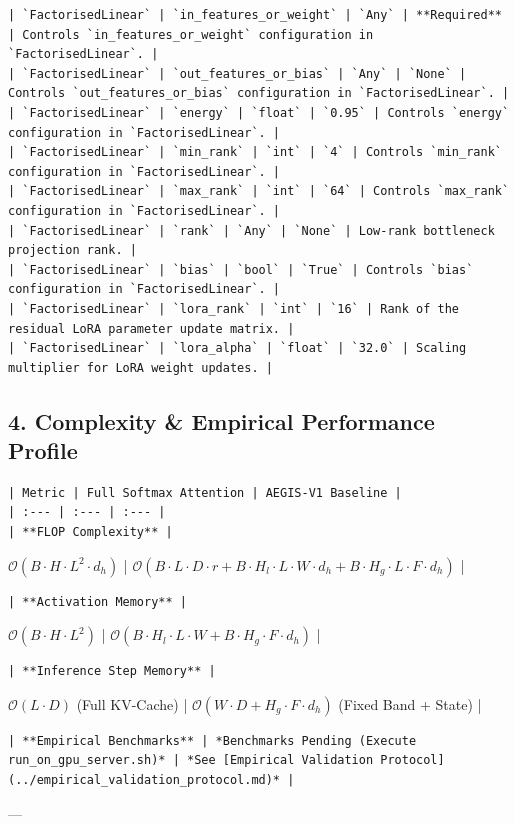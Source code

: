 \begin{verbatim}
| `FactorisedLinear` | `in_features_or_weight` | `Any` | **Required** | Controls `in_features_or_weight` configuration in `FactorisedLinear`. |
| `FactorisedLinear` | `out_features_or_bias` | `Any` | `None` | Controls `out_features_or_bias` configuration in `FactorisedLinear`. |
| `FactorisedLinear` | `energy` | `float` | `0.95` | Controls `energy` configuration in `FactorisedLinear`. |
| `FactorisedLinear` | `min_rank` | `int` | `4` | Controls `min_rank` configuration in `FactorisedLinear`. |
| `FactorisedLinear` | `max_rank` | `int` | `64` | Controls `max_rank` configuration in `FactorisedLinear`. |
| `FactorisedLinear` | `rank` | `Any` | `None` | Low-rank bottleneck projection rank. |
| `FactorisedLinear` | `bias` | `bool` | `True` | Controls `bias` configuration in `FactorisedLinear`. |
| `FactorisedLinear` | `lora_rank` | `int` | `16` | Rank of the residual LoRA parameter update matrix. |
| `FactorisedLinear` | `lora_alpha` | `float` | `32.0` | Scaling multiplier for LoRA weight updates. |
\end{verbatim}


\subsection{4. Complexity \& Empirical Performance Profile}
\begin{verbatim}
| Metric | Full Softmax Attention | AEGIS-V1 Baseline |
| :--- | :--- | :--- |
| **FLOP Complexity** | 
\end{verbatim}$\mathcal{O}(B \cdot H \cdot L^2 \cdot d_h)$ | $\mathcal{O}(B \cdot L \cdot D \cdot r + B \cdot H_l \cdot L \cdot W \cdot d_h + B \cdot H_g \cdot L \cdot F \cdot d_h)$ |
\begin{verbatim}
| **Activation Memory** | 
\end{verbatim}$\mathcal{O}(B \cdot H \cdot L^2)$ | $\mathcal{O}(B \cdot H_l \cdot L \cdot W + B \cdot H_g \cdot F \cdot d_h)$ |
\begin{verbatim}
| **Inference Step Memory** | 
\end{verbatim}$\mathcal{O}(L \cdot D)$ (Full KV-Cache) | $\mathcal{O}(W \cdot D + H_g \cdot F \cdot d_h)$ (Fixed Band + State) |
\begin{verbatim}
| **Empirical Benchmarks** | *Benchmarks Pending (Execute run_on_gpu_server.sh)* | *See [Empirical Validation Protocol](../empirical_validation_protocol.md)* |
\end{verbatim}

---

